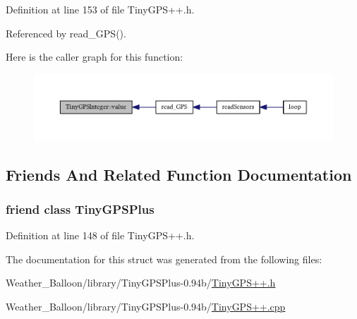 Definition at line 153 of file Tiny\+G\+P\+S++.\+h.



Referenced by read\+\_\+\+G\+P\+S().



Here is the caller graph for this function\+:\nopagebreak
\begin{figure}[H]
\begin{center}
\leavevmode
\includegraphics[width=350pt]{struct_tiny_g_p_s_integer_a67de7e76d61dbd25eb32f701d8ce867b_icgraph}
\end{center}
\end{figure}




\subsection{Friends And Related Function Documentation}
\subsubsection[{\texorpdfstring{Tiny\+G\+P\+S\+Plus}{TinyGPSPlus}}]{\setlength{\rightskip}{0pt plus 5cm}friend class {\bf Tiny\+G\+P\+S\+Plus}\hspace{0.3cm}{\ttfamily [friend]}}\hypertarget{struct_tiny_g_p_s_integer_a6501fd5ef19ae166d43e0e5781609ee2}{}\label{struct_tiny_g_p_s_integer_a6501fd5ef19ae166d43e0e5781609ee2}


Definition at line 148 of file Tiny\+G\+P\+S++.\+h.



The documentation for this struct was generated from the following files\+:\begin{DoxyCompactItemize}
\item 
Weather\+\_\+\+Balloon/library/\+Tiny\+G\+P\+S\+Plus-\/0.\+94b/\hyperlink{_tiny_g_p_s_09_09_8h}{Tiny\+G\+P\+S++.\+h}\item 
Weather\+\_\+\+Balloon/library/\+Tiny\+G\+P\+S\+Plus-\/0.\+94b/\hyperlink{_tiny_g_p_s_09_09_8cpp}{Tiny\+G\+P\+S++.\+cpp}\end{DoxyCompactItemize}
